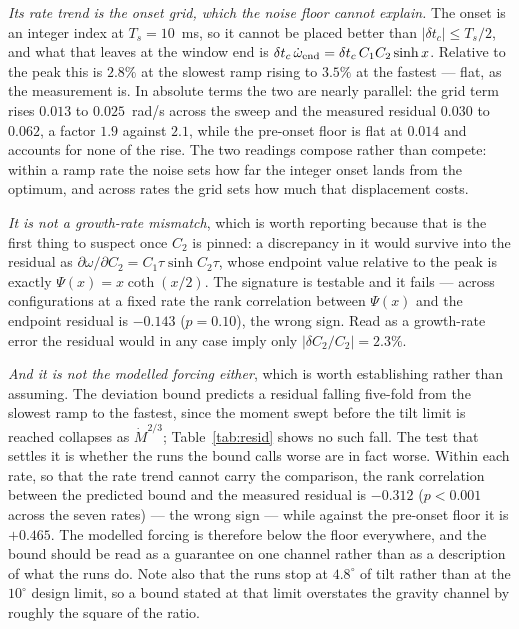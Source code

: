 \documentclass[10pt]{article}
\begin{document}
\emph{Its rate trend is the onset grid, which the noise floor cannot
explain.} The onset is an integer index at $T_s = 10$~ms, so it cannot
be placed better than $|\delta t_c| \le T_s/2$, and what that leaves at
the window end is $\delta t_c\,\dot\omega_{\rm end} =
\delta t_c\,C_1C_2\sinh x$. Relative to the peak this is $2.8\%$ at the
slowest ramp rising to $3.5\%$ at the fastest — flat, as the
measurement is. In absolute terms the two are nearly parallel: the grid
term rises $0.013$ to $0.025$~rad/s across the sweep and the measured
residual $0.030$ to $0.062$, a factor $1.9$ against $2.1$, while the
pre-onset floor is flat at $0.014$ and accounts for none of the rise.
The two readings compose rather than compete: within a ramp rate the
noise sets how far the integer onset lands from the optimum, and across
rates the grid sets how much that displacement costs.

\emph{It is not a growth-rate mismatch}, which is worth reporting
because that is the first thing to suspect once $C_2$ is pinned: a
discrepancy in it would survive into the residual as
$\partial\omega/\partial C_2 = C_1\tau\sinh C_2\tau$, whose endpoint
value relative to the peak is exactly $\Psi(x) = x\coth(x/2)$. The
signature is testable and it fails — across configurations at a fixed
rate the rank correlation between $\Psi(x)$ and the endpoint residual is
$-0.143$ ($p = 0.10$), the wrong sign. Read as a growth-rate error the
residual would in any case imply only $|\delta C_2/C_2| = 2.3\%$.

\emph{And it is not the modelled forcing either}, which is worth
establishing rather than assuming. The deviation bound predicts a
residual falling five-fold from the slowest ramp to the fastest, since
the moment swept before the tilt limit is reached collapses as
$\dot M^{2/3}$; Table~\ref{tab:resid} shows no such fall. The test that
settles it is whether the runs the bound calls worse are in fact worse.
Within each rate, so that the rate trend cannot carry the comparison,
the rank correlation between the predicted bound and the measured
residual is $-0.312$ ($p < 0.001$ across the seven rates) — the wrong
sign — while against the pre-onset floor it is $+0.465$. The modelled
forcing is therefore below the floor everywhere, and the bound should be
read as a guarantee on one channel rather than as a description of what
the runs do. Note also that the runs stop at $4.8^\circ$ of tilt
rather than at the $10^\circ$ design limit, so a bound stated at that
limit overstates the gravity channel by roughly the square of the
ratio.
\end{document}
